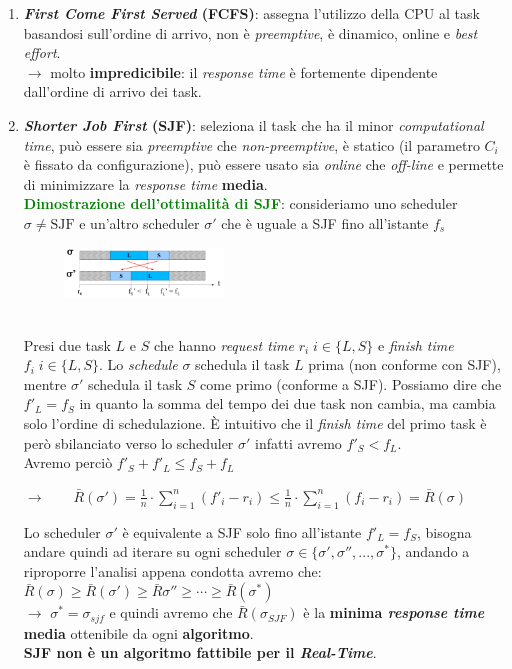 \begin{enumerate}

    \item \textbf{\textit{First Come First Served} (FCFS)}: assegna l'utilizzo della CPU al task basandosi sull'ordine di arrivo, non è \textit{preemptive}, è dinamico, online e \textit{best effort}. \\
    $\rightarrow$ molto \textbf{impredicibile}: il \textit{response time} è fortemente dipendente dall'ordine di arrivo dei task.

    \item \textbf{\textit{Shorter Job First} (SJF)}: seleziona il task che ha il minor \textit{computational time}, può essere sia \textit{preemptive} che \textit{non-preemptive}, è statico (il parametro $C_i$ è fissato da configurazione), può essere usato sia \textit{online} che \textit{off-line} e permette di minimizzare la \textit{response time} \textbf{media}. \\
    \textcolor{green}{\textbf{Dimostrazione dell'ottimalità di SJF}}: consideriamo uno scheduler $\sigma \neq \text{SJF}$ e un'altro scheduler $\sigma'$ che è uguale a SJF fino all'istante $f_s$
    \begin{figure}[h]
        \centering
        \includegraphics[width=0.4\textwidth]{img/sjf_opt}    
    \end{figure}
    \\ 
    Presi due task $L$ e $S$ che hanno \textit{request time} $r_i \; i \in \{L, S\}$ e \textit{finish time} $f_i \; i \in \{L, S\}$. Lo \textit{schedule} $\sigma$ schedula il task $L$ prima (non conforme con SJF), mentre $\sigma'$ schedula il task $S$ come primo (conforme a SJF). Possiamo dire che $f'_L = f_S$ in quanto la somma del tempo dei due task non cambia, ma cambia solo l'ordine di schedulazione. È intuitivo che il \textit{finish time} del primo task è però sbilanciato verso lo scheduler $\sigma'$ infatti avremo $f'_S < f_L$. \\
    Avremo perciò $f'_S + f'_L \leq f_S + f_L$ 
    \begin{center}
        $\rightarrow \qquad \bar{R}(\sigma') = \frac{1}{n} \cdot \sum_{i = 1}^{n}{(f'_i - r_i)} \leq \frac{1}{n} \cdot \sum_{i = 1}^{n}{(f_i - r_i)} = \bar{R}(\sigma)$
    \end{center}
    Lo scheduler $\sigma'$ è equivalente a SJF solo fino all'istante $f'_L = f_S$, bisogna andare quindi ad iterare su ogni scheduler $\sigma \in \{\sigma', \sigma'', ..., \sigma^*\}$, andando a riproporre l'analisi appena condotta avremo che: $\bar{R}(\sigma) \geq \bar{R}(\sigma') \geq \bar{R}{\sigma''} \geq \cdots \geq \bar{R}(\sigma^*)$ \\
    $\rightarrow$ $\sigma^* = \sigma_{sjf}$ e quindi avremo che $\bar{R}(\sigma_{SJF})$ è la \textbf{minima \textit{response time} media} ottenibile da ogni \textbf{algoritmo}. \\
    \textbf{SJF non è un algoritmo fattibile per il \textit{Real-Time}}.


\end{enumerate}
